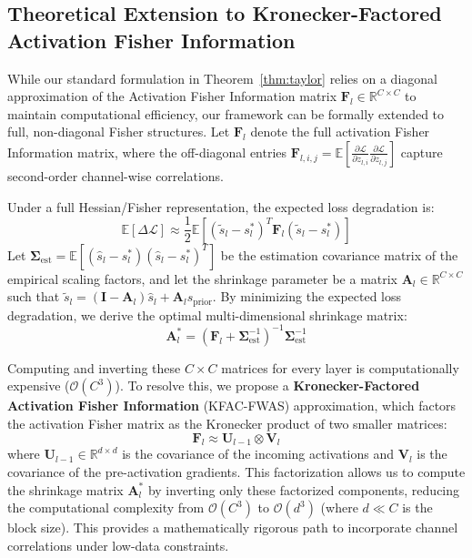 \documentclass{article}
\theoremstyle{plain}
\theoremstyle{definition}
\theoremstyle{remark}
\begin{document}
\subsection{Theoretical Extension to Kronecker-Factored Activation Fisher Information}
\label{sec:kfac}

While our standard formulation in Theorem~\ref{thm:taylor} relies on a diagonal approximation of the Activation Fisher Information matrix $\mathbf{F}_l \in \mathbb{R}^{C \times C}$ to maintain computational efficiency, our framework can be formally extended to full, non-diagonal Fisher structures. Let $\mathbf{F}_l$ denote the full activation Fisher Information matrix, where the off-diagonal entries $\mathbf{F}_{l,i,j} = \mathbb{E}[\frac{\partial \mathcal{L}}{\partial z_{l,i}}\frac{\partial \mathcal{L}}{\partial z_{l,j}}]$ capture second-order channel-wise correlations.

Under a full Hessian/Fisher representation, the expected loss degradation is:
\begin{equation}
    \mathbb{E}[\Delta \mathcal{L}] \approx \frac{1}{2} \mathbb{E}\left[ (\tilde{s}_l - s^*_l)^T \mathbf{F}_l (\tilde{s}_l - s^*_l) \right]
\end{equation}
Let $\boldsymbol{\Sigma}_{\text{est}} = \mathbb{E}[(\hat{s}_l - s^*_l)(\hat{s}_l - s^*_l)^T]$ be the estimation covariance matrix of the empirical scaling factors, and let the shrinkage parameter be a matrix $\mathbf{A}_l \in \mathbb{R}^{C \times C}$ such that $\tilde{s}_l = (\mathbf{I} - \mathbf{A}_l)\hat{s}_l + \mathbf{A}_l s_{\text{prior}}$. By minimizing the expected loss degradation, we derive the optimal multi-dimensional shrinkage matrix:
\begin{equation}
    \mathbf{A}_l^* = \left( \mathbf{F}_l + \boldsymbol{\Sigma}_{\text{est}}^{-1} \right)^{-1} \boldsymbol{\Sigma}_{\text{est}}^{-1}
\end{equation}

Computing and inverting these $C \times C$ matrices for every layer is computationally expensive ($\mathcal{O}(C^3)$). To resolve this, we propose a \textbf{Kronecker-Factored Activation Fisher Information} (KFAC-FWAS) approximation, which factors the activation Fisher matrix as the Kronecker product of two smaller matrices:
\begin{equation}
    \mathbf{F}_l \approx \mathbf{U}_{l-1} \otimes \mathbf{V}_l
\end{equation}
where $\mathbf{U}_{l-1} \in \mathbb{R}^{d \times d}$ is the covariance of the incoming activations and $\mathbf{V}_l$ is the covariance of the pre-activation gradients. This factorization allows us to compute the shrinkage matrix $\mathbf{A}_l^*$ by inverting only these factorized components, reducing the computational complexity from $\mathcal{O}(C^3)$ to $\mathcal{O}(d^3)$ (where $d \ll C$ is the block size). This provides a mathematically rigorous path to incorporate channel correlations under low-data constraints.
\end{document}
